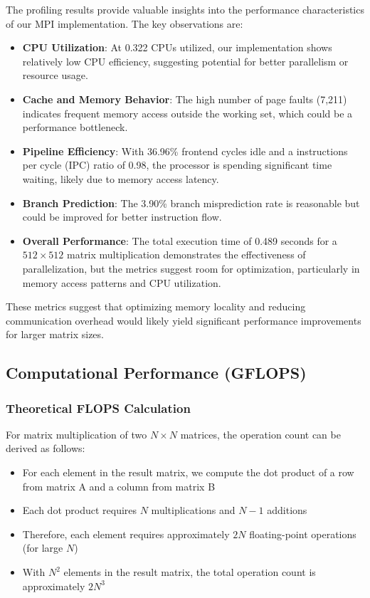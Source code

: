 \documentclass{article}
\begin{document}
The profiling results provide valuable insights into the performance characteristics of our MPI implementation. The key observations are:

\begin{itemize}
    \item \textbf{CPU Utilization}: At 0.322 CPUs utilized, our implementation shows relatively low CPU efficiency, suggesting potential for better parallelism or resource usage.
    
    \item \textbf{Cache and Memory Behavior}: The high number of page faults (7,211) indicates frequent memory access outside the working set, which could be a performance bottleneck.
    
    \item \textbf{Pipeline Efficiency}: With 36.96\% frontend cycles idle and a instructions per cycle (IPC) ratio of 0.98, the processor is spending significant time waiting, likely due to memory access latency.
    
    \item \textbf{Branch Prediction}: The 3.90\% branch misprediction rate is reasonable but could be improved for better instruction flow.
    
    \item \textbf{Overall Performance}: The total execution time of 0.489 seconds for a $512 \times 512$ matrix multiplication demonstrates the effectiveness of parallelization, but the metrics suggest room for optimization, particularly in memory access patterns and CPU utilization.
\end{itemize}

These metrics suggest that optimizing memory locality and reducing communication overhead would likely yield significant performance improvements for larger matrix sizes.

\subsection*{Computational Performance (GFLOPS)}

\subsubsection*{Theoretical FLOPS Calculation}
For matrix multiplication of two $N \times N$ matrices, the operation count can be derived as follows:

\begin{itemize}
    \item For each element in the result matrix, we compute the dot product of a row from matrix A and a column from matrix B
    \item Each dot product requires $N$ multiplications and $N-1$ additions
    \item Therefore, each element requires approximately $2N$ floating-point operations (for large $N$)
    \item With $N^2$ elements in the result matrix, the total operation count is approximately $2N^3$
\end{itemize}
\end{document}
